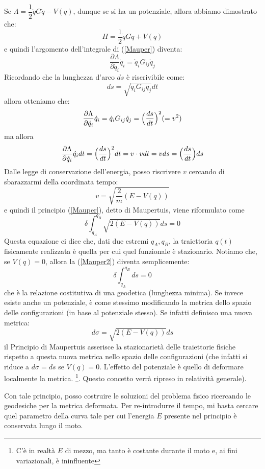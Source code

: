 \documentclass[a4paper,openany]{article}
\begin{document}
	Se $\Lambda = \dfrac{1}{2}\dot{q}G\dot{q} - V(q)$, dunque se si ha un potenziale, allora abbiamo dimostrato che:
	$$
	H = \dfrac{1}{2}\dot{q}G\dot{q} + V(q)
	$$
	e quindi l'argomento dell'integrale di (\ref{Mauper}) diventa:
	$$
	\dfrac{\partial \Lambda}{\partial \dot{q}_i} \dot{q}_i = \dot{q}_iG_{ij}\dot{q}_j
	$$
	Ricordando che la lunghezza d'arco $ds$ è riscrivibile come:
	$$
	ds = \sqrt{\dot{q}_i G_{ij} \dot{q}_j} dt
	$$
	allora otteniamo che:
	$$
	\dfrac{\partial \Lambda}{\partial \dot{q}_i} \dot{q}_i = \dot{q}_iG_{ij}\dot{q}_j = \Bigl(\dfrac{ds}{dt}\Bigl)^2 (= v^2)
	$$
	ma allora 
	$$
	\dfrac{\partial \Lambda}{\partial \dot{q}_i} \dot{q}_i dt = \Bigl(\dfrac{ds}{dt}\Bigl)^2 dt = v \cdot vdt = v ds = \Bigl(\dfrac{ds}{dt}\Bigl) ds
	$$
	Dalle legge di conservazione dell'energia, posso riscrivere $v$ cercando di sbarazzarmi della coordinata tempo:
	$$
	v = \sqrt{\dfrac{2}{m}(E-V(q))}
	$$
	e quindi il principio (\ref{Mauper}), detto di Maupertuis, viene riformulato come
	\begin{equation}
		\delta \int_{q_A}^{q_B} \sqrt{2(E-V(q))} ds = 0
		\label{Mauper2}
	\end{equation}
	Questa equazione ci dice che, dati due estremi $q_A, q_B$, la traiettoria $q(t)$ fisicamente realizzata è quella per cui quel funzionale è stazionario. Notiamo che, se $V(q)=0$, allora la (\ref{Mauper2}) diventa semplicemente:
	\begin{equation}\label{key}
		\delta \int_{q_A}^{q_B}  ds = 0
	\end{equation}
	che è la relazione costitutiva di una geodetica (lunghezza minima). Se invece esiste anche un potenziale, è come stessimo modificando la metrica dello spazio delle configurazioni (in base al potenziale stesso). Se infatti definisco una nuova metrica:
	$$
	d\sigma = \sqrt{2(E-V(q))} ds 
	$$
	il Principio di Maupertuis asserisce la stazionarietà delle traiettorie fisiche rispetto a questa nuova metrica nello spazio delle configurazioni (che infatti si riduce a $d\sigma = ds$ se $V(q)=0$. L'effetto del potenziale è quello di deformare localmente la metrica. \footnote{C'è in realtà $E$ di mezzo, ma tanto è costante durante il moto e, ai fini variazionali, è ininfluente}. Questo concetto verrà ripreso in relatività generale). 
	
	
	Con tale principio, posso costruire le soluzioni del problema fisico ricercando le geodesiche per la metrica deformata. Per re-introdurre il tempo, mi basta cercare quel parametro della curva tale per cui l'energia $E$ presente nel principio è conservata lungo il moto.
\end{document}
